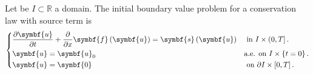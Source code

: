 \documentclass[
    8pt,
    aspectratio=1610,
    c,
    intlimits,
		handout,
    leqno,
    professionalfonts,
]{beamer}
\begin{document}
\begin{frame}
	\begin{definition}
		Let be $I\subset\mathbb{R}$ a domain.
		The initial boundary value problem for a conservation law with source term is
		\begin{equation}
			\begin{dcases}
				\diffp{\symbf{u}}{t}+
				\diffp{}{x}\symbf{f}\left(\symbf{u}\right)=
				\symbf{s}\left(\symbf{u}\right) & \text{ in }I\times\left(0,T\right].          \\
				\symbf{u}                                                      =
				\symbf{u}_{0}                   & \text{a.e. on }I\times\left\{t=0\right\}.    \\
				\symbf{u}                                                       =
				\symbf{0}                       & \text{ on }\partial I\times\left[0,T\right].
			\end{dcases}
		\end{equation}
	\end{definition}

	\pause


\end{frame}
\end{document}
